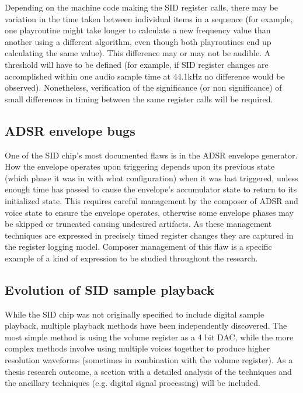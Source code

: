 \documentclass[10pt]{article}
\begin{document}
\begin{multicols*}{2}
Depending on the machine code making the SID register calls, there may be variation in the time taken between individual items in a sequence (for example, one playroutine might take longer to calculate a new frequency value than another using a different algorithm, even though both playroutines end up calculating the same value). This difference may or may not be audible. A threshold will have to be defined (for example, if SID register changes are accomplished within one audio sample time at 44.1kHz no difference would be observed). Nonetheless, verification of the significance (or non significance) of small differences in timing between the same register calls will be required.

\subsection{ADSR envelope bugs}

One of the SID chip’s most documented flaws is in the ADSR envelope generator. How the envelope operates upon triggering depends upon its previous state (which phase it was in with what configuration) when it was last triggered, unless enough time has passed to cause the envelope’s accumulator state to return to its initialized state. This requires careful management by the composer of ADSR and voice state to ensure the envelope operates, otherwise some envelope phases may be skipped or truncated causing undesired artifacts. As these management techniques are expressed in precisely timed register changes they are captured in the register logging model. Composer management of this flaw is a specific example of a kind of expression to be studied throughout the research. 

\subsection{Evolution of SID sample playback}

While the SID chip was not originally specified to include digital sample playback, multiple playback methods have been independently discovered. The most simple method is using the volume register as a 4 bit DAC, while the more complex methods involve using multiple voices together to produce higher resolution waveforms (sometimes in combination with the volume register). As a thesis research outcome, a section with a detailed analysis of the techniques and the ancillary techniques (e.g. digital signal processing) will be included.


\end{multicols*}
\end{document}
